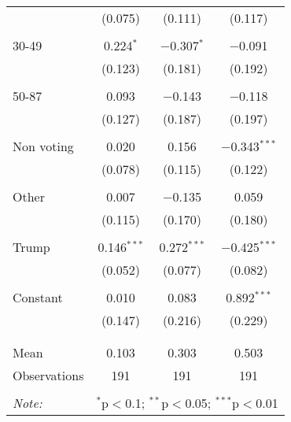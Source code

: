 \begin{tabular}{@{\extracolsep{5pt}}lccc}
  & (0.075) & (0.111) & (0.117) \\ 
  & & & \\ 
 30-49 & 0.224$^{*}$ & $-$0.307$^{*}$ & $-$0.091 \\ 
  & (0.123) & (0.181) & (0.192) \\ 
  & & & \\ 
 50-87 & 0.093 & $-$0.143 & $-$0.118 \\ 
  & (0.127) & (0.187) & (0.197) \\ 
  & & & \\ 
 Non voting & 0.020 & 0.156 & $-$0.343$^{***}$ \\ 
  & (0.078) & (0.115) & (0.122) \\ 
  & & & \\ 
 Other & 0.007 & $-$0.135 & 0.059 \\ 
  & (0.115) & (0.170) & (0.180) \\ 
  & & & \\ 
 Trump & 0.146$^{***}$ & 0.272$^{***}$ & $-$0.425$^{***}$ \\ 
  & (0.052) & (0.077) & (0.082) \\ 
  & & & \\ 
 Constant & 0.010 & 0.083 & 0.892$^{***}$ \\ 
  & (0.147) & (0.216) & (0.229) \\ 
  & & & \\ 
\hline \\[-1.8ex] 
Mean & 0.103 & 0.303 & 0.503 \\ 
Observations & 191 & 191 & 191 \\ 
\hline 
\hline \\[-1.8ex] 
\textit{Note:}  & \multicolumn{3}{r}{$^{*}$p$<$0.1; $^{**}$p$<$0.05; $^{***}$p$<$0.01} \\ 
\end{tabular} 
